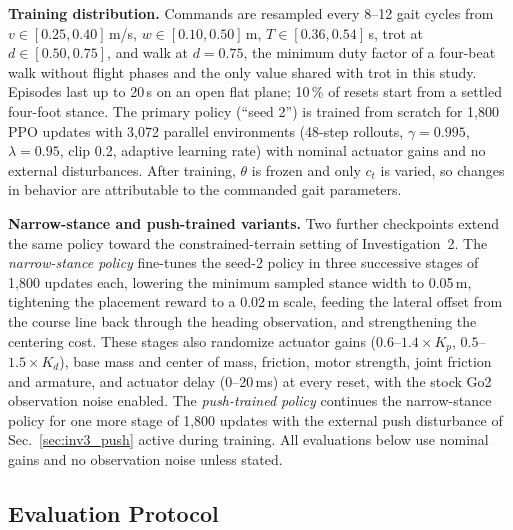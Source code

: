 \textbf{Training distribution.} Commands are resampled every 8--12 gait cycles
from $v\in[0.25,0.40]$\,m/s, $w\in[0.10,0.50]$\,m, $T\in[0.36,0.54]$\,s,
trot at $d\in[0.50,0.75]$, and walk at $d=0.75$, the minimum duty factor of a
four-beat walk without flight phases and the only value shared with trot in
this study. Episodes last up to 20\,s on an open flat plane; 10\,\% of resets
start from a settled four-foot stance. The primary policy (``seed 2'') is
trained from scratch for 1{,}800 PPO updates with 3{,}072 parallel
environments (48-step rollouts, $\gamma=0.995$, $\lambda=0.95$, clip 0.2,
adaptive learning rate) with nominal actuator gains and no external
disturbances. After training, $\theta$ is frozen and only $c_t$ is varied, so
changes in behavior are attributable to the commanded gait parameters.

\textbf{Narrow-stance and push-trained variants.} Two further checkpoints
extend the same policy toward the constrained-terrain setting of
Investigation~2. The \emph{narrow-stance policy} fine-tunes the seed-2 policy
in three successive stages of 1{,}800 updates each, lowering the minimum
sampled stance width to 0.05\,m, tightening the placement reward to a 0.02\,m
scale, feeding the lateral offset from the course line back through the
heading observation, and strengthening the centering cost. These stages also
randomize actuator gains ($0.6$--$1.4\times K_p$, $0.5$--$1.5\times K_d$),
base mass and center of mass, friction, motor strength, joint friction and
armature, and actuator delay (0--20\,ms) at every reset, with the stock Go2
observation noise enabled. The \emph{push-trained policy} continues the
narrow-stance policy for one more stage of 1{,}800 updates with the external
push disturbance of Sec.~\ref{sec:inv3_push} active during training. All
evaluations below use nominal gains and no observation noise unless stated.

\subsection{Evaluation Protocol}
\label{sec:inv3_protocol}

